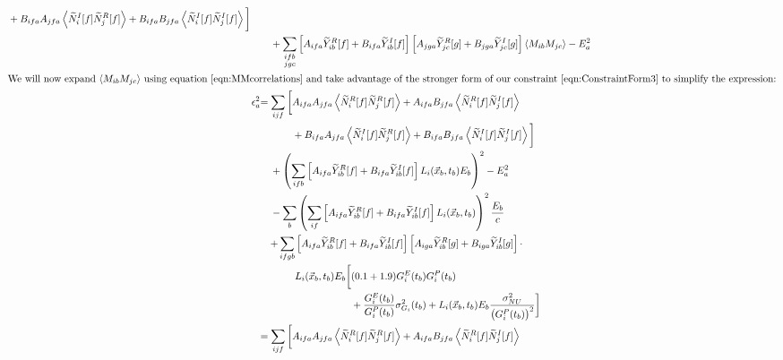 \begin{align}
\begin{aligned}
  & + B_{ifa}A_{jfa} \left<\widetilde{N}_i^I[f]\widetilde{N}_j^R[f]\right> + B_{ifa}B_{jfa} \left<\widetilde{N}_i^I[f]\widetilde{N}_j^I[f]\right>\bigg] \end{aligned} \nonumber \\
&\quad + \sum_{\substack{ifb\\jgc}} \left[A_{ifa} \widetilde{Y}_{ib}^R[f] + B_{ifa} \widetilde{Y}_{ib}^I[f]\right]\left[A_{jga} \widetilde{Y}_{jc}^R[g] + B_{jga} \widetilde{Y}_{jc}^I[g]\right] \left<M_{ib}M_{jc}\right> - E^2_a \\
%
\intertext{We will now expand $\left<M_{ib}M_{jc}\right>$ using equation~\ref{eqn:MMcorrelations} and take advantage of the stronger form of our constraint~\ref{eqn:ConstraintForm3} to simplify the expression:}
%
\epsilon^2_a & \begin{aligned}[t]
  = \sum_{ijf} \bigg[ & A_{ifa}A_{jfa} \left<\widetilde{N}_i^R[f]\widetilde{N}_j^R[f]\right> + A_{ifa}B_{jfa} \left<\widetilde{N}_i^R[f]\widetilde{N}_j^I[f]\right> \\
  & + B_{ifa}A_{jfa} \left<\widetilde{N}_i^I[f]\widetilde{N}_j^R[f]\right> + B_{ifa}B_{jfa} \left<\widetilde{N}_i^I[f]\widetilde{N}_j^I[f]\right>\bigg] \end{aligned} \nonumber \\
&\quad + \left( \sum_{ifb} \left[A_{ifa} \widetilde{Y}_{ib}^R[f] + B_{ifa} \widetilde{Y}_{ib}^I[f]\right] L_i(\vec{x}_b,t_b) E_b \right)^2 - E^2_a \nonumber \\
&\quad - \sum_b \left( \sum_{if} \left[A_{ifa} \widetilde{Y}_{ib}^R[f] + B_{ifa} \widetilde{Y}_{ib}^I[f]\right] L_i(\vec{x}_b,t_b) \right)^2 \frac{E_b}{c} \nonumber \\
&\quad \begin{aligned}
  + \sum_{ifgb} &\left[A_{ifa} \widetilde{Y}_{ib}^R[f] + B_{ifa} \widetilde{Y}_{ib}^I[f]\right]\left[A_{iga} \widetilde{Y}_{ib}^R[g] + B_{iga} \widetilde{Y}_{ib}^I[g]\right] \cdot \\
  & \begin{aligned}
    L_i(\vec{x}_b,t_b) E_b \bigg[ &(0.1 + 1.9) G^E_i(t_b) G^P_i(t_b) \\
    & + \frac{G^E_i(t_b)}{G^P_i(t_b)} \sigma^2_{G_i}(t_b) + L_i(\vec{x}_b,t_b) E_b \frac{\sigma^2_{NU}}{\left(G^P_i(t_b)\right)^2} \bigg]
\end{aligned} \end{aligned} \\
%
& \begin{aligned}
  = \sum_{ijf} \bigg[ & A_{ifa}A_{jfa} \left<\widetilde{N}_i^R[f]\widetilde{N}_j^R[f]\right> + A_{ifa}B_{jfa} \left<\widetilde{N}_i^R[f]\widetilde{N}_j^I[f]\right> \\

\end{aligned}
\end{align}
